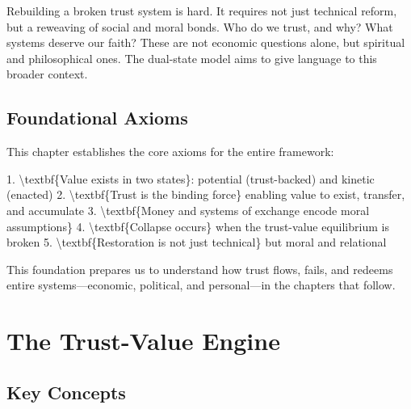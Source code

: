\documentclass[11pt,oneside]{book}
\begin{document}
Rebuilding a broken trust system is hard. It requires not just technical reform, but a reweaving of social and moral bonds. Who do we trust, and why? What systems deserve our faith? These are not economic questions alone, but spiritual and philosophical ones. The dual-state model aims to give language to this broader context.

\section{Foundational Axioms}

This chapter establishes the core axioms for the entire framework:

1. \textbackslash textbf\{Value exists in two states\}: potential (trust-backed) and kinetic (enacted)
2. \textbackslash textbf\{Trust is the binding force\} enabling value to exist, transfer, and accumulate
3. \textbackslash textbf\{Money and systems of exchange encode moral assumptions\}
4. \textbackslash textbf\{Collapse occurs\} when the trust-value equilibrium is broken
5. \textbackslash textbf\{Restoration is not just technical\} but moral and relational

This foundation prepares us to understand how trust flows, fails, and redeems entire systems—economic, political, and personal—in the chapters that follow.


\chapter{ The Trust-Value Engine}

\section{Key Concepts}
\end{document}
